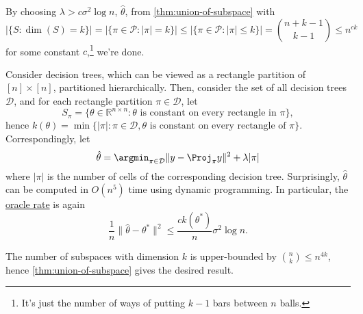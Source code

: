 \begin{explanation}
	By choosing \(\lambda > c \sigma ^2 \log n\), \(\hat{\theta} \), from \autoref{thm:union-of-subspace} with
	\[
		\vert \{ S \colon \dim (S) = k \} \vert
		= \vert \{\pi \in \mathcal{P} \colon \vert \pi \vert = k \} \vert
		\leq \vert \{\pi \in \mathcal{P} \colon \vert \pi \vert \leq k \} \vert
		= \binom{n+k-1}{k-1}
		\leq n^{ck}
	\]
	for some constant \(c\),\footnote{It's just the number of ways of putting \(k-1\) bars between \(n\) balls.} we're done.
\end{explanation}

\begin{eg}
	Consider decision trees, which can be viewed as a rectangle partition of \([n] \times [n]\), partitioned hierarchically. Then, consider the set of all decision trees \(\mathcal{D} \), and for each rectangle partition \(\pi \in \mathcal{D} \), let
	\[
		S_\pi = \{ \theta \in \mathbb{R} ^{n \times n} \colon \theta \text{ is constant on every rectangle in } \pi \},
	\]
	hence \(k(\theta )= \min \{ \vert \pi \vert \colon \pi \in \mathcal{D} , \theta \text{ is constant on every rectangle of } \pi \} \). Correspondingly, let
	\[
		\hat{\theta} = \argmin_{\pi \in \mathcal{D} } \lVert y - \Proj_\pi y \rVert ^2 + \lambda \vert \pi \vert
	\]
	where \(\vert \pi  \vert \) is the number of cells of the corresponding decision tree. Surprisingly, \(\hat{\theta} \) can be computed in \(O(n^5)\) time using dynamic programming. In particular, the \hyperref[not:oracle-rate]{oracle rate} is again
	\[
		\frac{1}{n} \lVert \hat{\theta} - \theta ^{\ast}  \rVert ^2
		\leq \frac{c k(\theta ^{\ast} )}{n} \sigma ^2 \log n.
	\]
\end{eg}
\begin{explanation}
	The number of subspaces with dimension \(k\) is upper-bounded by \(\binom{n}{k} \leq n^{4k}\), hence \autoref{thm:union-of-subspace} gives the desired result.
\end{explanation}
